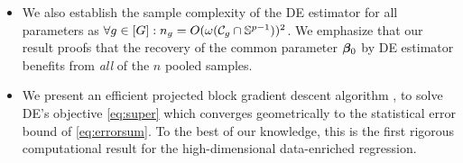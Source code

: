\begin{itemize}[leftmargin = .4cm]
	\item We also establish the sample complexity of the DE estimator for all parameters as $\forall g \in [G]: n_g = O(\omega({\cal C}_g \cap \mathbb S^{p-1}))^2$. We emphasize that our result proofs that the recovery of the common parameter $\boldsymbol{\beta}_0$ by DE estimator benefits from \emph{all} of the $n$ pooled samples.
	\item We present an efficient projected block gradient descent algorithm \emph{\dc}, to solve DE's objective \eqref{eq:super} which converges geometrically to the statistical error bound of \eqref{eq:errorsum}. To the best of our knowledge, this is the first rigorous computational result for the high-dimensional data-enriched regression.
\end{itemize}


